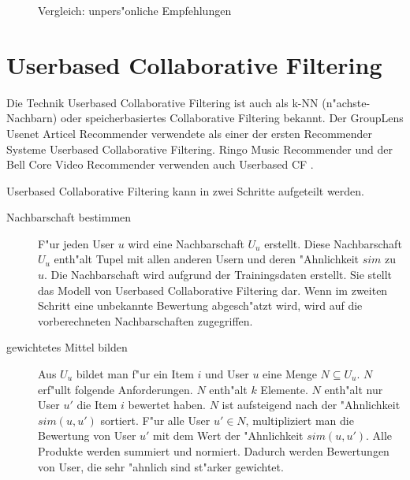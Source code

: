\documentclass[a4paper, 12pt]{article}
\begin{document}
\begin{figure}
  \centering
{}
  
  \caption{Vergleich: unpers"onliche Empfehlungen}
  \label{fig:maebaselines}
\end{figure}


\section{Userbased Collaborative Filtering}

Die Technik Userbased Collaborative Filtering ist auch als k-NN (n"achste-Nachbarn) oder speicherbasiertes Collaborative Filtering bekannt. Der GroupLens Usenet Articel Recommender verwendete als einer der ersten Recommender Systeme Userbased Collaborative Filtering. Ringo Music Recommender und der Bell Core Video Recommender verwenden auch Userbased CF \cite{ekstrand11}.

Userbased Collaborative Filtering kann in zwei Schritte aufgeteilt werden. 

\begin{description}
\item[Nachbarschaft bestimmen] F"ur jeden User $u$ wird eine Nachbarschaft $U_u$ erstellt. Diese Nachbarschaft $U_u$ enth"alt Tupel mit allen anderen Usern und deren "Ahnlichkeit $sim$ zu $u$. Die Nachbarschaft wird aufgrund der Trainingsdaten erstellt. Sie stellt das Modell von Userbased Collaborative Filtering dar. Wenn im zweiten Schritt eine unbekannte Bewertung abgesch"atzt wird, wird auf die vorberechneten Nachbarschaften zugegriffen.
\item [gewichtetes Mittel bilden] Aus $U_u$ bildet man f"ur ein Item $i$ und User $u$ eine Menge $N \subseteq U_u$. $N$ erf"ullt folgende Anforderungen. $N$ enth"alt $k$ Elemente. $N$ enth"alt nur User $u'$ die Item $i$ bewertet haben. $N$ ist aufsteigend nach der "Ahnlichkeit $sim(u,u')$ sortiert. F"ur alle User $u' \in N$, multipliziert man die Bewertung von User $u'$ mit dem Wert der "Ahnlichkeit $sim(u,u')$. Alle Produkte werden summiert und normiert. Dadurch werden Bewertungen von User, die sehr "ahnlich sind st"arker gewichtet. 
\end{description}
\end{document}
